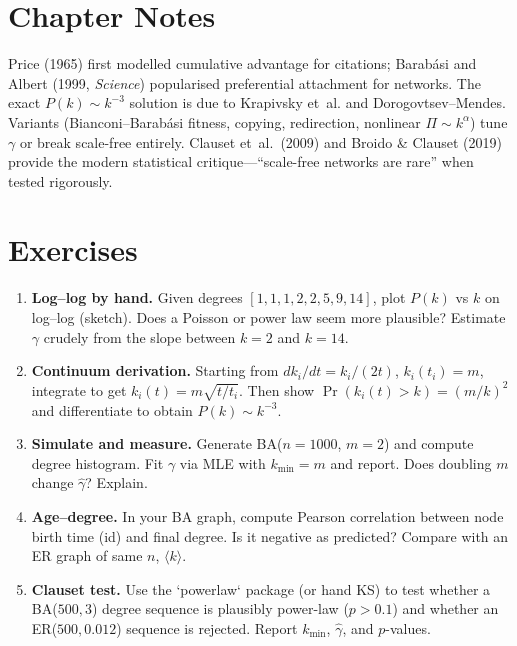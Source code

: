 \section{Chapter Notes}
Price (1965) first modelled cumulative advantage for citations; Barab\'asi and Albert (1999, \emph{Science}) popularised preferential attachment for networks. The exact $P(k)\sim k^{-3}$ solution is due to Krapivsky et~al. and Dorogovtsev--Mendes. Variants (Bianconi--Barab\'asi fitness, copying, redirection, nonlinear $\Pi\sim k^\alpha$) tune $\gamma$ or break scale-free entirely. Clauset et~al.\ (2009) and Broido \& Clauset (2019) provide the modern statistical critique---``scale-free networks are rare'' when tested rigorously.

\section{Exercises}
\label{sec:ch05-exercises}
\begin{enumerate}[label=E5.\arabic*, leftmargin=*, itemsep=0.8em]
    \item \textbf{Log--log by hand.} Given degrees $[1,1,1,2,2,5,9,14]$, plot $P(k)$ vs $k$ on log--log (sketch). Does a Poisson or power law seem more plausible? Estimate $\gamma$ crudely from the slope between $k=2$ and $k=14$.
    \item \textbf{Continuum derivation.} Starting from $dk_i/dt=k_i/(2t)$, $k_i(t_i)=m$, integrate to get $k_i(t)=m\sqrt{t/t_i}$. Then show $\Pr(k_i(t)>k)=(m/k)^2$ and differentiate to obtain $P(k)\sim k^{-3}$.
    \item \textbf{Simulate and measure.} Generate BA($n=1000$, $m=2$) and compute degree histogram. Fit $\gamma$ via MLE with $k_{\min}=m$ and report. Does doubling $m$ change $\hat\gamma$? Explain.
    \item \textbf{Age--degree.} In your BA graph, compute Pearson correlation between node birth time (id) and final degree. Is it negative as predicted? Compare with an ER graph of same $n$, $\langle k\rangle$.
    \item \textbf{Clauset test.} Use the `powerlaw` package (or hand KS) to test whether a BA($500,3$) degree sequence is plausibly power-law ($p>0.1$) and whether an ER($500,0.012$) sequence is rejected. Report $k_{\min}$, $\hat\gamma$, and $p$-values.
\end{enumerate}
